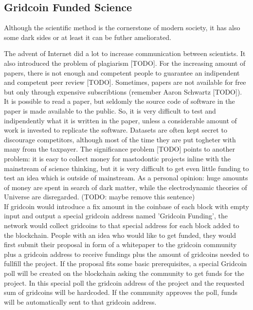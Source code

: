 \subsection{Gridcoin Funded Science}

Although the scientific method is the cornerstone of modern society, it has also some dark sides or at least it can be futher ameliorated. 

The advent of Internet did a lot to increase communication between scientists. It also introduced the problem of plagiarism [TODO]. For the increasing amount of papers, there is not enough and competent people to guarantee an indipendent and competent peer review [TODO]. Sometimes, papers are not available for free but only through expensive subscribtions (remember Aaron Schwartz [TODO]). It is possible to read a paper, but seldomly the source code of software in the paper is made available to the public. So, it is very difficult to test and indipendently what it is written in the paper, unless a considerable amount of work is invested to replicate the software. Datasets are often kept secret to discourage competitors, although most of the time they are put togheter with many from the taxpayer. The significance problem [TODO] points to another problem: it is easy to collect money for mastodontic projects inline with the mainstream of science thinking, but it is very difficult to get even little funding to test an idea which is outside of mainstream. As a personal opinion: huge amounts of money are spent in search of dark matter, while the electrodynamic theories of Universe are disregarded. (TODO: maybe remove this sentence)\\

If gridcoin would introduce a fix amount in the coinbase of each block with empty input and output a special gridcoin address named 'Gridcoin Funding', the network would collect gridcoins to that special address for each block added to the blockchain. People with an idea who would like to get funded, they would first submit their proposal in form of a whitepaper to the gridcoin community plus a gridcoin address to receive fundings plus the amount of gridcoins needed to fullfill the project. If the proposal fits some basic prerequisites, a special Gridcoin poll will be created on the blockchain asking the community to get funds for the project. In this special poll the gridcoin address of the project and the requested sum of gridcoins will be hardcoded. If the community approves the poll, funds will be automatically sent to that gridcoin address.\\

